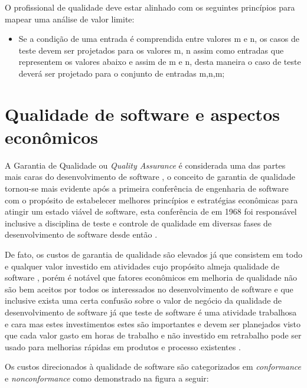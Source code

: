 \documentclass[
	12pt,				%
	oneside,			%
	a4paper,			%
	english,			%
	brazil				%
	]{abntex2ppgsi}
\begin{document}
O profissional de qualidade deve estar alinhado com os seguintes princípios para mapear uma análise de valor limite:

\begin{itemize}
	\item Se a condição de uma entrada  é comprendida entre valores m e n, os casos de teste devem ser projetados para os valores m, n assim como entradas que representem os valores abaixo e assim de m e n, desta maneira o caso de teste deverá ser projetado para o conjunto de entradas {m,n,m};
\end{itemize}



\section{Qualidade de software e aspectos econômicos}

A Garantia de Qualidade ou \textit{Quality Assurance} é considerada uma das partes mais caras do desenvolvimento de software \cite{wagner2005}, o conceito de garantia de qualidade tornou-se mais evidente após a primeira conferência de engenharia de software com o propósito de estabelecer melhores princípios e estratégias econômicas para atingir um estado viável de software, esta conferência de em 1968 foi responsável	 inclusive a disciplina de teste e controle de qualidade em diversas  fases de desenvolvimento de software desde então \cite{repasi2009}.

De fato, os custos de garantia de qualidade são elevados \cite{wagner2005} \cite{Korel1990} já que consistem em todo e qualquer valor investido em atividades cujo propósito almeja qualidade de software \cite{pressman2009engenharia}, porém é notável que fatores econômicos em melhoria de qualidade não são bem aceitos por todos os interessados no desenvolvimento de software e que inclusive exista uma certa confusão sobre o valor de negócio da qualidade de desenvolvimento de software \cite{slaughter1998} já que teste de software é uma atividade trabalhosa e cara \cite{Korel1990} mas estes investimentos estes são importantes e devem ser planejados visto que cada valor gasto em horas de trabalho e não investido em retrabalho pode ser usado para melhorias rápidas em produtos e processo existentes \cite{slaughter1998}.

Os custos direcionados à qualidade de software são categorizados em \textit{conformance} e \textit{nonconformance} \cite{ slaughter1998}\cite{pressman2009engenharia} como demonstrado na figura a seguir: 
\end{document}
